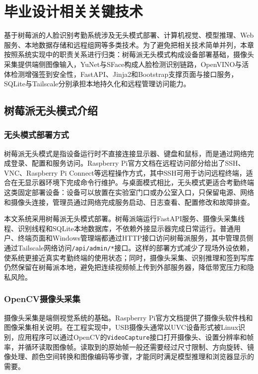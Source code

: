 \chapter{毕业设计相关关键技术}

基于树莓派的人脸识别考勤系统涉及无头模式部署、计算机视觉、模型推理、Web服务、本地数据存储和远程组网等多类技术。为了避免把相关技术简单并列，本章按照系统实现中的职责关系进行归类：树莓派无头模式构成设备部署基础，摄像头采集提供端侧图像输入，YuNet与SFace构成人脸检测识别链路，OpenVINO与活体检测增强签到安全性，FastAPI、Jinja2和Bootstrap支撑页面与接口服务，SQLite与Tailscale分别承担本地持久化和远程管理访问能力。

\section{树莓派无头模式介绍}

\subsection{无头模式部署方式}

树莓派无头模式是指设备运行时不直接连接显示器、键盘和鼠标，而是通过网络完成登录、配置和服务访问。Raspberry Pi官方文档在远程访问部分给出了SSH、VNC、Raspberry Pi Connect等远程操作方式，其中SSH可用于访问远程终端，适合在无显示器环境下完成命令行维护\cite{raspberrypi_remote_access}。与桌面模式相比，无头模式更适合考勤终端这类固定部署设备：设备可以放置在实验室门口或办公室入口，只保留电源、网络和摄像头连接，管理员通过网络完成服务启动、日志查看、配置修改和故障排查。

本文系统采用树莓派无头模式部署。树莓派端运行FastAPI服务、摄像头采集线程、识别线程和SQLite本地数据库，不依赖外接显示器完成日常运行。普通用户、终端页面和Windows管理端都通过HTTP接口访问树莓派服务，其中管理员侧通过Tailscale网络访问\texttt{/api/admin/*}接口。这样的部署方式减少了现场外设依赖，使系统更接近真实考勤终端的使用状态；同时，摄像头采集、识别推理和签到写库仍然保留在树莓派本地，避免把连续视频帧上传到外部服务器，降低带宽压力和隐私风险。

\subsection{OpenCV摄像头采集}

摄像头采集是端侧视觉系统的基础。Raspberry Pi官方文档提供了摄像头软件栈和图像采集相关说明\cite{raspberrypi_camera}。在工程实现中，USB摄像头通常以UVC设备形式被Linux识别，应用程序可以通过OpenCV的\texttt{VideoCapture}接口打开摄像头、设置分辨率和帧率，并循环读取图像帧。读取到的原始帧一般还需要经过尺寸限制、方向旋转、镜像处理、颜色空间转换和图像编码等步骤，才能同时满足模型推理和浏览器显示的需要。

